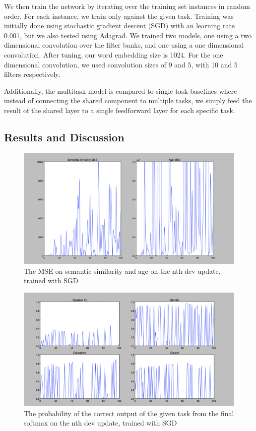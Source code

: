 \documentclass{article}
\begin{document}
We then train the network by iterating over the training set instances in random order.  For each instance, we train only against the given task.  Training was initially done using stochastic gradient descent (SGD) with an learning rate 0.001, but we also tested using Adagrad.  We trained two models, one using a two dimensional convolution over the filter banks, and one using a one dimensional convolution.  After tuning, our word embedding size is 1024.  For the one dimensional convolution, we used convolution sizes of 9 and 5, with 10 and 5 filters respectively.

Additionally, the multitask model is compared to single-task baselines where instead of connecting the shared component to multiple tasks, we simply feed the result of the shared layer to a single feedforward layer for each specific task.

\subsection{Results and Discussion}

\begin{figure}[h!]
\centering
\includegraphics[scale=.2]{images/sgd_mle.png}
\caption{The MSE on semantic similarity and age on the nth dev update, trained with SGD}
\label{fig:mse_semantic_age}
\end{figure}

\begin{figure}[h!]
\centering
\includegraphics[scale=.25]{images/sgd_4task.png}
\caption{The probability of the correct output of the given task from the final softmax on the nth dev update, trained with SGD}
\label{fig:prob}
\end{figure}
\end{document}
